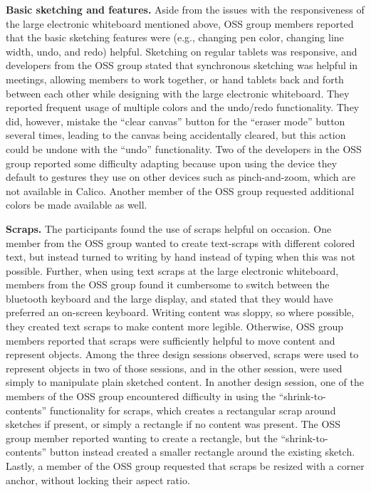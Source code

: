 \documentclass[12pt,fleqn]{ucithesis}
\begin{document}
\textbf{Basic sketching and features.} Aside from the issues with the responsiveness of the large electronic whiteboard mentioned above, OSS group members reported that the basic sketching features were (e.g., changing pen color, changing line width, undo, and redo) helpful. Sketching on regular tablets was responsive, and developers from the OSS group stated that synchronous sketching was helpful in meetings, allowing members to work together, or hand tablets back and forth between each other while designing with the large electronic whiteboard. They reported frequent usage of multiple colors and the undo/redo functionality.  They did, however, mistake the ``clear canvas'' button for the ``eraser mode'' button several times, leading to the canvas being accidentally cleared, but this action could be undone with the ``undo'' functionality. Two of the developers in the OSS group reported some difficulty adapting because upon using the device they default to gestures they use on other devices such as pinch-and-zoom, which are not available in Calico. Another member of the OSS group requested additional colors be made available as well.

\textbf{Scraps.} The participants found the use of scraps helpful on occasion. One member from the OSS group wanted to create text-scraps with different colored text, but instead turned to writing by hand instead of typing when this was not possible. Further, when using text scraps at the large electronic whiteboard, members from the OSS group found it cumbersome to switch between the bluetooth keyboard and the large display, and stated that they would have preferred an on-screen keyboard. Writing content was sloppy, so where possible, they created text scraps to make content more legible. Otherwise, OSS group members reported that scraps were sufficiently helpful to move content and represent objects. Among the three design sessions observed, scraps were used to represent objects in two of those sessions, and in the other session, were used simply to manipulate plain sketched content.  In another design session, one of the members of the OSS group encountered difficulty in using the ``shrink-to-contents'' functionality for scraps, which creates a rectangular scrap around sketches if present, or simply a rectangle if no content was present. The OSS group member reported wanting to create a rectangle, but the ``shrink-to-contents'' button instead created a smaller rectangle around the existing sketch. Lastly, a member of the OSS group requested that scraps be resized with a corner anchor, without locking their aspect ratio.
\end{document}
